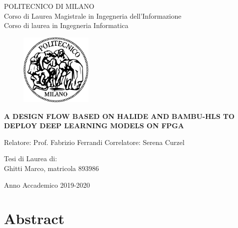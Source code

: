 \documentclass[11pt, a4paper, twoside, openright]{report}
\begin{document}
\thispagestyle{empty}
\setlength{\parskip}{1em}
{\bfseries
\begin{center}

\large
POLITECNICO DI MILANO\\
\normalsize
Corso di Laurea Magistrale in Ingegneria dell’Informazione \\
Corso di laurea in Ingegneria Informatica \par
  
\vspace{3em}
  
  \begin{figure}[htbp]
    \begin{center}
      \includegraphics[width=3.5cm]{logopm.png}
    \end{center}
  \end{figure}
  \vspace*{0.3cm} \Large
  \textbf{A DESIGN FLOW BASED ON HALIDE AND BAMBU-HLS TO DEPLOY DEEP LEARNING MODELS ON FPGA}\\

\end{center}
\vspace*{3.0cm} \large
\begin{flushleft}

  Relatore: Prof. Fabrizio Ferrandi 
  \newline
  Correlatore: Serena Curzel

\end{flushleft}
\vspace*{1cm}
\begin{flushright}

  Tesi di Laurea di:\\ Ghitti Marco, matricola 893986
\end{flushright}
\vspace*{1cm}
\begin{center}

  Anno Accademico 2019-2020
\end{center} \clearpage
}

\thispagestyle{empty}
\null
\newpage

\chapter*{Abstract}
\end{document}
